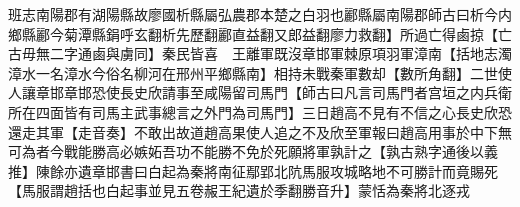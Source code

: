 班志南陽郡有湖陽縣故廖國析縣屬弘農郡本楚之白羽也酈縣屬南陽郡師古曰析今内鄉縣酈今菊潭縣鋗呼玄翻析先歷翻酈直益翻又郎益翻廖力救翻】所過亡得鹵掠【亡古毋無二字通鹵與虜同】秦民皆喜　王離軍既沒章邯軍棘原項羽軍漳南【括地志濁漳水一名漳水今俗名柳河在邢州平鄉縣南】相持未戰秦軍數却【數所角翻】二世使人讓章邯章邯恐使長史欣請事至咸陽留司馬門【師古曰凡言司馬門者宫垣之内兵衛所在四面皆有司馬主武事總言之外門為司馬門】三日趙高不見有不信之心長史欣恐還走其軍【走音奏】不敢出故道趙高果使人追之不及欣至軍報曰趙高用事於中下無可為者今戰能勝高必嫉妬吾功不能勝不免於死願將軍孰計之【孰古熟字通後以義推】陳餘亦遺章邯書曰白起為秦將南征鄢郢北阬馬服攻城略地不可勝計而竟賜死【馬服謂趙括也白起事並見五卷赧王紀遺於季翻勝音升】蒙恬為秦將北逐戎